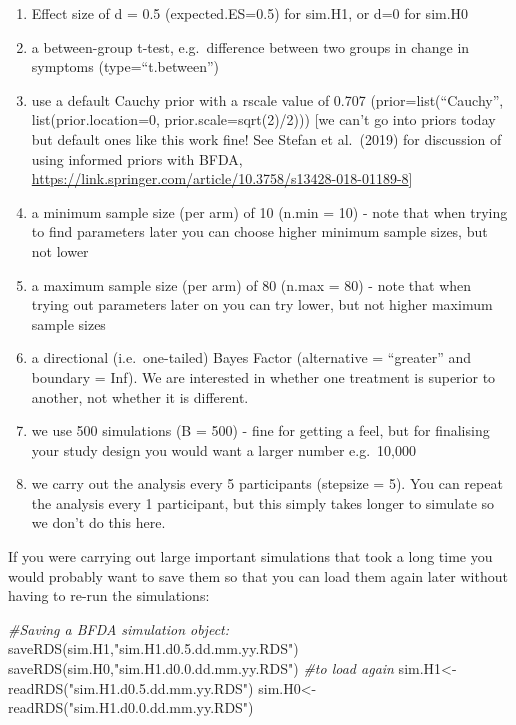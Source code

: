 \documentclass[
]{book}
\newenvironment{Shaded}{\begin{snugshade}}{\end{snugshade}}
\newcommand{\CommentTok}[1]{\textcolor[rgb]{0.56,0.35,0.01}{\textit{#1}}}
\newcommand{\FunctionTok}[1]{\textcolor[rgb]{0.00,0.00,0.00}{#1}}
\newcommand{\NormalTok}[1]{#1}
\newcommand{\OtherTok}[1]{\textcolor[rgb]{0.56,0.35,0.01}{#1}}
\newcommand{\StringTok}[1]{\textcolor[rgb]{0.31,0.60,0.02}{#1}}
\begin{document}
\begin{enumerate}
\def\labelenumi{\alph{enumi})}
\item
  Effect size of d = 0.5 (expected.ES=0.5) for sim.H1, or d=0 for sim.H0
\item
  a between-group t-test, e.g.~difference between two groups in change in symptoms (type=``t.between'')
\item
  use a default Cauchy prior with a rscale value of 0.707 (prior=list(``Cauchy'', list(prior.location=0, prior.scale=sqrt(2)/2))) {[}we can't go into priors today but default ones like this work fine! See Stefan et al.~(2019) for discussion of using informed priors with BFDA, \url{https://link.springer.com/article/10.3758/s13428-018-01189-8}{]}
\item
  a minimum sample size (per arm) of 10 (n.min = 10) - note that when trying to find parameters later you can choose higher minimum sample sizes, but not lower
\item
  a maximum sample size (per arm) of 80 (n.max = 80) - note that when trying out parameters later on you can try lower, but not higher maximum sample sizes
\item
  a directional (i.e.~one-tailed) Bayes Factor (alternative = ``greater'' and boundary = Inf). We are interested in whether one treatment is superior to another, not whether it is different.
\item
  we use 500 simulations (B = 500) - fine for getting a feel, but for finalising your study design you would want a larger number e.g.~10,000
\item
  we carry out the analysis every 5 participants (stepsize = 5). You can repeat the analysis every 1 participant, but this simply takes longer to simulate so we don't do this here.
\end{enumerate}

If you were carrying out large important simulations that took a long time you would probably want to save them so that you can load them again later without having to re-run the simulations:

\begin{Shaded}
\begin{Highlighting}[]
\CommentTok{\#Saving a BFDA simulation object:}
\FunctionTok{saveRDS}\NormalTok{(sim.H1,}\StringTok{"sim.H1.d0.5.dd.mm.yy.RDS"}\NormalTok{)}
\FunctionTok{saveRDS}\NormalTok{(sim.H0,}\StringTok{"sim.H1.d0.0.dd.mm.yy.RDS"}\NormalTok{)}
\CommentTok{\#to load again}
\NormalTok{sim.H1}\OtherTok{\textless{}{-}}\FunctionTok{readRDS}\NormalTok{(}\StringTok{"sim.H1.d0.5.dd.mm.yy.RDS"}\NormalTok{)}
\NormalTok{sim.H0}\OtherTok{\textless{}{-}}\FunctionTok{readRDS}\NormalTok{(}\StringTok{"sim.H1.d0.0.dd.mm.yy.RDS"}\NormalTok{)}
\end{Highlighting}
\end{Shaded}
\end{document}
